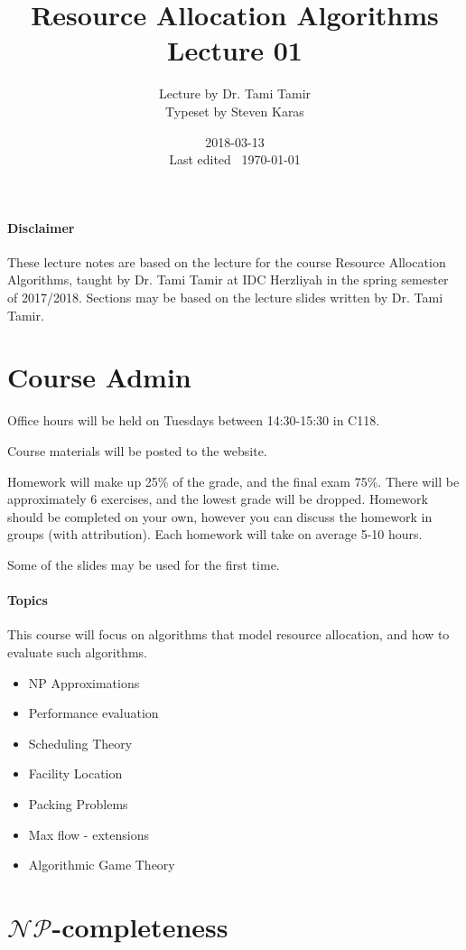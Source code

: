 \documentclass{idc_msc}
\title{Resource Allocation Algorithms\\\large Lecture 01}
\date{2018-03-13 \\ Last edited \currenttime\ \today}
\author{Lecture by Dr. Tami Tamir\\Typeset by Steven Karas}
\newcommand{\NPclass}{\mathcal{NP}}
\begin{document}
\maketitle

\paragraph{Disclaimer}

These lecture notes are based on the lecture for the course Resource Allocation Algorithms, taught by Dr. Tami Tamir at IDC Herzliyah in the spring semester of 2017/2018.
Sections may be based on the lecture slides written by Dr. Tami Tamir.

\section{Course Admin}

Office hours will be held on Tuesdays between 14:30-15:30 in C118.

Course materials will be posted to the website.

Homework will make up 25\% of the grade, and the final exam 75\%.
There will be approximately 6 exercises, and the lowest grade will be dropped.
Homework should be completed on your own, however you can discuss the homework in groups (with attribution).
Each homework will take on average 5-10 hours.

Some of the slides may be used for the first time.

\paragraph{Topics}

This course will focus on algorithms that model resource allocation, and how to evaluate such algorithms.

\begin{itemize}
  \item NP Approximations
  \item Performance evaluation
  \item Scheduling Theory
  \item Facility Location
  \item Packing Problems
  \item Max flow - extensions
  \item Algorithmic Game Theory
\end{itemize}

\section{\texorpdfstring{\(\NPclass\)}{NP}-completeness}
\end{document}
